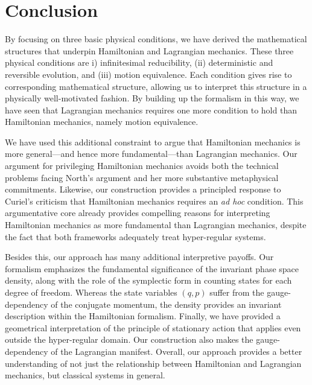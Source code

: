 \documentclass[12pt, english, twoside]{article} %
\begin{document}
\section{Conclusion}
\label{conclusion}

By focusing on three basic physical conditions, we have derived the mathematical structures that underpin Hamiltonian and Lagrangian mechanics. These three physical conditions are i) infinitesimal reducibility, (ii) deterministic and reversible evolution, and (iii) motion equivalence. Each condition gives rise to corresponding mathematical structure, allowing us to interpret this structure in a physically well-motivated fashion. By building up the formalism in this way, we have seen that Lagrangian mechanics requires one more condition to hold than Hamiltonian mechanics, namely motion equivalence.

We have used this additional constraint to argue that Hamiltonian mechanics is more general---and hence more fundamental---than Lagrangian mechanics. Our argument for privileging Hamiltonian mechanics avoids both the technical problems facing North's \parencites*[]{North} argument and her more substantive metaphysical commitments. Likewise, our construction provides a principled response to Curiel's \parencites*[]{Curiel} criticism that Hamiltonian mechanics requires an \textit{ad hoc} condition. This argumentative core already provides compelling reasons for interpreting Hamiltonian mechanics as more fundamental than Lagrangian mechanics, despite the fact that both frameworks adequately treat hyper-regular systems.

Besides this, our approach has many additional interpretive payoffs. Our formalism emphasizes the fundamental significance of the invariant phase space density, along with the role of the symplectic form in counting states for each degree of freedom. Whereas the state variables $(q, p)$ suffer from the gauge-dependency of the conjugate momentum, the density provides an invariant description within the Hamiltonian formalism. Finally, we have provided a geometrical interpretation of the principle of stationary action that applies even outside the hyper-regular domain. Our construction also makes the gauge-dependency of the Lagrangian manifest. Overall, our approach provides a better understanding of not just the relationship between Hamiltonian and Lagrangian mechanics, but classical systems in general.
\end{document}
